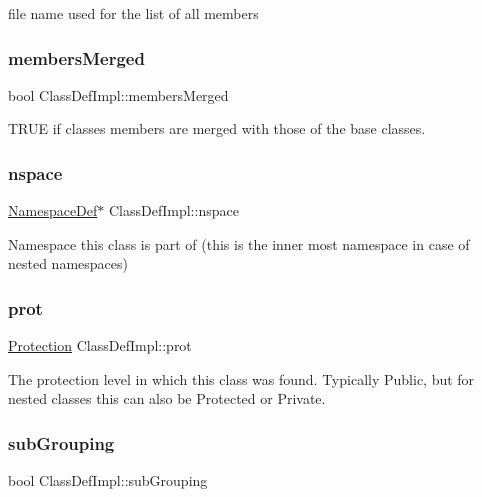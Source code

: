 file name used for the list of all members \mbox{\label{class_class_def_impl_ab613a11051f5ad3265ddc3b25ef50a82}} 
\subsubsection{\texorpdfstring{membersMerged}{membersMerged}}
{\footnotesize\ttfamily bool Class\+Def\+Impl\+::members\+Merged}

T\+R\+UE if classes members are merged with those of the base classes. \mbox{\label{class_class_def_impl_ab48a04c16cebd115877f07f540b44c15}} 
\subsubsection{\texorpdfstring{nspace}{nspace}}
{\footnotesize\ttfamily \mbox{\hyperlink{class_namespace_def}{Namespace\+Def}}$\ast$ Class\+Def\+Impl\+::nspace}

Namespace this class is part of (this is the inner most namespace in case of nested namespaces) \mbox{\label{class_class_def_impl_a08fcc20edfd7a4c7090217f21389f929}} 
\subsubsection{\texorpdfstring{prot}{prot}}
{\footnotesize\ttfamily \mbox{\hyperlink{types_8h_a90e352184df58cd09455fe9996cd4ded}{Protection}} Class\+Def\+Impl\+::prot}

The protection level in which this class was found. Typically Public, but for nested classes this can also be Protected or Private. \mbox{\label{class_class_def_impl_ad11ebe89f9a6c199c5ef2b63ef2a10cc}} 
\subsubsection{\texorpdfstring{subGrouping}{subGrouping}}
{\footnotesize\ttfamily bool Class\+Def\+Impl\+::sub\+Grouping}

